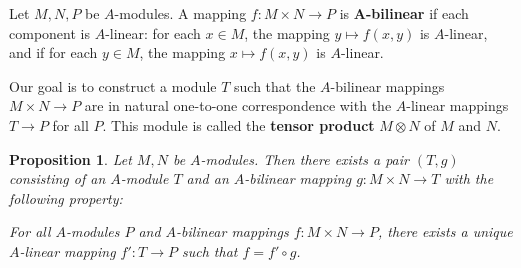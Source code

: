 \documentclass[11pt]{article}
\newtheorem{proposition}{Proposition}
\begin{document}
Let $M, N, P$ be $A$-modules. A mapping $f : M \times N \to P$ is \textbf{A-bilinear} if each component is $A$-linear: for each $x \in M$, the mapping $y \mapsto f(x, y)$ is $A$-linear, and if for each $y \in M$, the mapping $x \mapsto f(x, y)$ is $A$-linear.

Our goal is to construct a module $T$ such that the $A$-bilinear mappings $M \times N \to P$ are in natural one-to-one correspondence with the $A$-linear mappings $T \to P$ for all $P$. This module is called the \textbf{tensor product} $M \otimes N$ of $M$ and $N$.

\begin{adjustwidth}{0.5cm}{}
  \begin{proposition}
    Let $M, N$ be $A$-modules. Then there exists a pair $(T, g)$ consisting of an $A$-module $T$ and an $A$-bilinear mapping $g : M \times N \to T$ with the following property:

    For all $A$-modules $P$ and $A$-bilinear mappings $f : M \times N \to P$, there exists a unique $A$-linear mapping $f' : T \to P$ such that $f = f' \circ g$. 


\end{proposition}
\end{adjustwidth}
\end{document}
